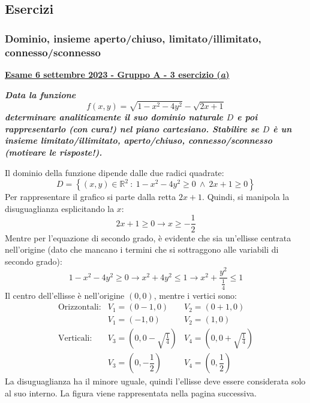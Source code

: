 \documentclass[a4paper]{article}
\newcommand{\definition}[1]{\textcolor{Red3}{\textbf{#1}}}
\newcommand{\example}[1]{\textcolor{Green4}{\textbf{#1}}}
\begin{document}
	\subsection{Esercizi}

	\subsubsection{Dominio, insieme aperto/chiuso, limitato/illimitato, connesso/sconnesso}

	\begin{flushleft}
		\label{exam: esame 06 settembre 2023 - Gruppo A - 3 esercizio (a)}
		\hypertarget{
			exam: esame 06 settembre 2023 - Gruppo A - 3 esercizio (a)
		}{
			\definition{\underline{Esame 6 settembre 2023 - Gruppo A - 3 esercizio (\emph{a})}}
		}
	\end{flushleft}
	\example{\emph{Data la funzione}
	\begin{equation*}
		f\left(x,y\right) = \sqrt{1-x^{2}-4y^{2}} - \sqrt{2x+1}
	\end{equation*}
	\emph{determinare analiticamente il suo dominio naturale $D$ e poi rappresentarlo (con cura!) nel piano cartesiano. Stabilire se $D$ è un insieme limitato/illimitato, aperto/chiuso, connesso/sconnesso (motivare le risposte!).}}\newline

	\noindent
	Il dominio della funzione dipende dalle due radici quadrate:
	\begin{equation*}
		D = \left\{\left(x,y\right) \in \mathbb{R}^{2} \: : \: 1 - x^{2} - 4y^{2} \ge 0 \: \land \: 2x + 1 \ge 0\right\}
	\end{equation*}
	Per rappresentare il grafico si parte dalla retta $2x+1$. Quindi, si manipola la disuguaglianza esplicitando la $x$:
	\begin{equation*}
		2x+1 \ge 0 \longrightarrow x \ge -\dfrac{1}{2}
	\end{equation*}
	Mentre per l'equazione di secondo grado, è evidente che sia un'ellisse centrata nell'origine (dato che mancano i termini che si sottraggono alle variabili di secondo grado):
	\begin{equation*}
		1 - x^{2} - 4y^{2} \ge 0 \longrightarrow x^{2} + 4y^{2} \le 1 \longrightarrow x^{2} + \dfrac{y^{2}}{\frac{1}{4}} \le 1
	\end{equation*}
	Il centro dell'ellisse è nell'origine $\left(0,0\right)$, mentre i vertici sono:
	\begin{equation*}
		\begin{array}{lll}
			\text{Orizzontali:} & V_{1}=\left(0-1,0\right) 	& V_{2}=\left(0+1,0\right) \\ [.3em]
								& V_{1}=\left(-1,0\right)	& V_{2}=\left(1,0\right) \\ [1em]
			\text{Verticali:}	& V_{3}=\left(0,0-\sqrt{\frac{1}{4}}\right) & V_{4}=\left(0,0+\sqrt{\frac{1}{4}}\right) \\ [.8em]
								& V_{3}=\left(0,-\dfrac{1}{2}\right) & V_{4}=\left(0,\dfrac{1}{2}\right)
		\end{array}
	\end{equation*}
	La disuguaglianza ha il minore uguale, quindi l'ellisse deve essere considerata solo al suo interno. La figura viene rappresentata nella pagina successiva.\newpage
\end{document}

